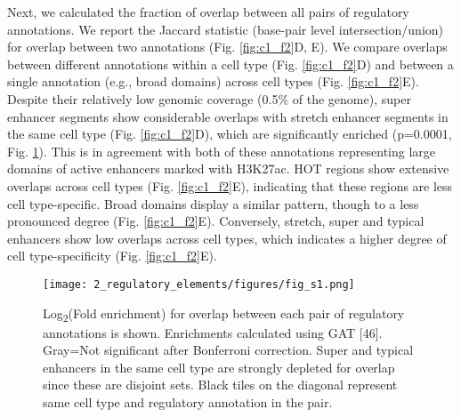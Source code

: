 Next, we calculated the fraction of overlap between all pairs of regulatory annotations. We report the Jaccard statistic (base-pair level intersection/union) for overlap between two annotations (Fig. \ref{fig:c1_f2}D, E). We compare overlaps between different annotations within a cell type (Fig. \ref{fig:c1_f2}D) and between a single annotation (e.g., broad domains) across cell types (Fig. \ref{fig:c1_f2}E). Despite their relatively low genomic coverage (0.5\% of the genome), super enhancer segments show considerable overlaps with stretch enhancer segments in the same cell type (Fig. \ref{fig:c1_f2}D), which are significantly enriched (p=0.0001, Fig. \ref{fig:c1_fs1}). This is in agreement with both of these annotations representing large domains of active enhancers marked with H3K27ac. HOT regions show extensive overlaps across cell types (Fig. \ref{fig:c1_f2}E), indicating that these regions are less cell type-specific. Broad domains display a similar pattern, though to a less pronounced degree (Fig. \ref{fig:c1_f2}E). Conversely, stretch, super and typical enhancers show low overlaps across cell types, which indicates a higher degree of cell type-specificity (Fig. \ref{fig:c1_f2}E). \\

\begin{figure}
    \centering
    \texttt{[image: 2\_regulatory\_elements/figures/fig\_s1.png]}
    \caption[Overlap enrichment between pairs of regulatory annotations]{Log\textsubscript{2}(Fold enrichment) for overlap between each pair of regulatory annotations is shown. Enrichments calculated using GAT [46]. Gray=Not significant after Bonferroni correction. Super and typical enhancers in the same cell type are strongly depleted for overlap since these are disjoint sets. Black tiles on the diagonal represent same cell type and regulatory annotation in the pair.}
    \label{fig:c1_fs1}
\end{figure}


